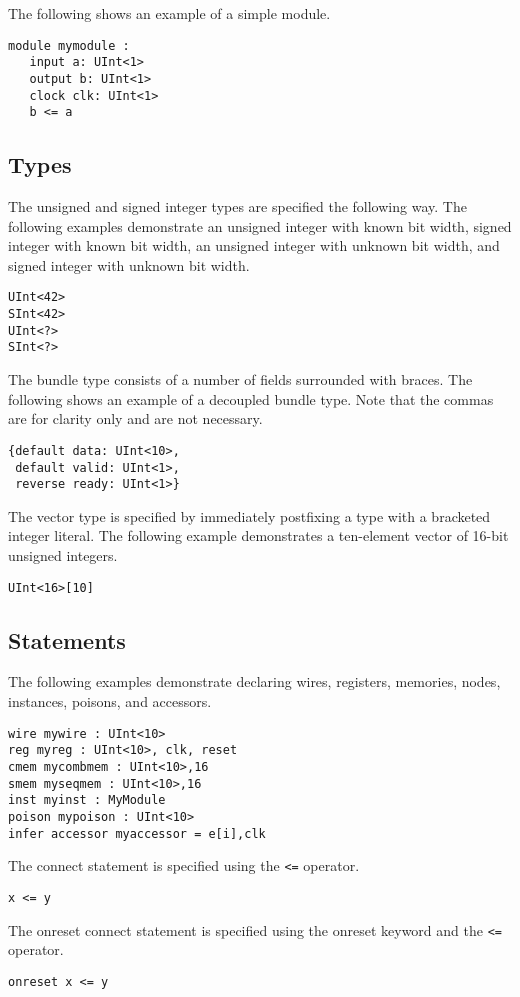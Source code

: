 \documentclass[12pt]{article}
\begin{document}
The following shows an example of a simple module.
\begin{verbatim}
module mymodule :
   input a: UInt<1>
   output b: UInt<1>
   clock clk: UInt<1>
   b <= a
\end{verbatim}

\subsection*{Types}
The unsigned and signed integer types are specified the following way.
The following examples demonstrate an unsigned integer with known bit width, signed integer with known bit width, an unsigned integer with unknown bit width, and signed integer with unknown bit width.
\begin{verbatim}
UInt<42>
SInt<42>
UInt<?>
SInt<?>
\end{verbatim}

The bundle type consists of a number of fields surrounded with braces.
The following shows an example of a decoupled bundle type.
Note that the commas are for clarity only and are not necessary.
\begin{verbatim}
{default data: UInt<10>,
 default valid: UInt<1>,
 reverse ready: UInt<1>} 
\end{verbatim}

The vector type is specified by immediately postfixing a type with a bracketed integer literal.
The following example demonstrates a ten-element vector of 16-bit unsigned integers.
\begin{verbatim}
UInt<16>[10]
\end{verbatim}

\subsection*{Statements}
The following examples demonstrate declaring wires, registers, memories, nodes, instances, poisons, and accessors.
\begin{verbatim}
wire mywire : UInt<10> 
reg myreg : UInt<10>, clk, reset 
cmem mycombmem : UInt<10>,16
smem myseqmem : UInt<10>,16
inst myinst : MyModule 
poison mypoison : UInt<10> 
infer accessor myaccessor = e[i],clk
\end{verbatim}

The connect statement is specified using the \verb|<=| operator.
\begin{verbatim}
x <= y
\end{verbatim}

The onreset connect statement is specified using the onreset keyword and the \verb|<=| operator.
\begin{verbatim}
onreset x <= y 
\end{verbatim}
\end{document}
